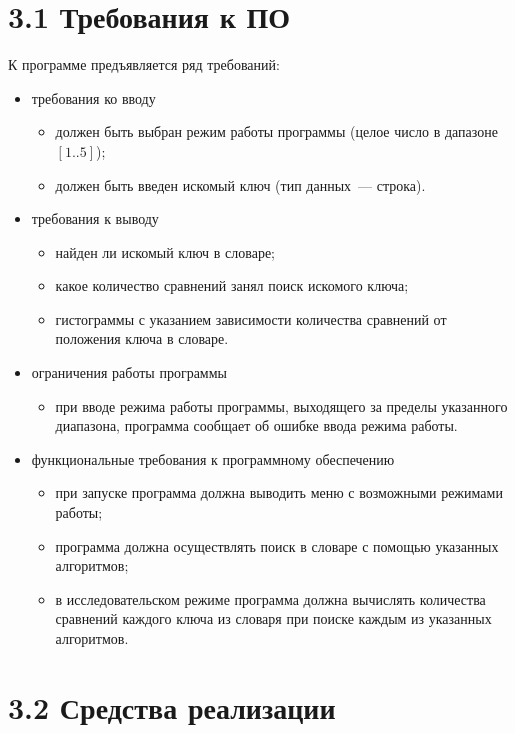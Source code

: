 \documentclass[12pt, a4paper]{report}
\begin{document}
	\section*{3.1 Требования к ПО}
	
	К программе предъявляется ряд требований:
	
	\begin{itemize}
		\item требования ко вводу
		\begin{itemize}
			\item должен быть выбран режим работы программы (целое число в дапазоне $[1..5]$);
			\item должен быть введен искомый ключ (тип данных~--- строка).
		\end{itemize}
		\item требования к выводу
		\begin{itemize}
			\item найден ли искомый ключ в словаре;
			\item какое количество сравнений занял поиск искомого ключа;
			\item гистограммы с указанием зависимости количества сравнений от положения ключа в словаре.
		\end{itemize}
		\item ограничения работы программы
		\begin{itemize}
			\item при вводе режима работы программы, выходящего за пределы указанного диапазона, программа сообщает об ошибке ввода режима работы.
		\end{itemize}
		\item функциональные требования к программному обеспечению
		\begin{itemize}
			\item при запуске программа должна выводить меню с возможными режимами работы;
			\item программа должна осуществлять поиск в словаре с помощью указанных алгоритмов;
			\item в исследовательском режиме программа должна вычислять количества сравнений каждого ключа из словаря при поиске каждым из указанных алгоритмов.
		\end{itemize}
	\end{itemize}
	
	\section*{3.2 Средства реализации}
	
\end{document}
